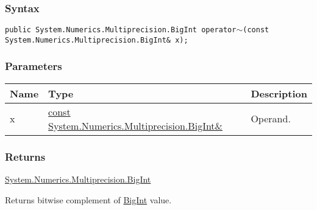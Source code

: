 \documentclass[a4paper,oneside,11.000000pt]{book}
\begin{document}
\subsubsection*{Syntax}
\texttt{public System.Numerics.Multiprecision.BigInt operator$\sim$(const System.Numerics.Multiprecision.BigInt\& x);}
\subsubsection*{Parameters}
\begin{flushleft}
\begin{supertabular}[l]{!{\raggedright}p{1.30721cm}!{\raggedright}p{8.55945cm}!{\raggedright}p{2.65538cm}}
\textbf{Name}
& \textbf{Type}
& \textbf{Description}
\\
\hline
x
& \hyperlink{System.Numerics.Multiprecision.BigInt}{const System.\-Numerics.\-Multiprecision.\-BigInt\&\-}
& Operand.

\\
\end{supertabular}

\end{flushleft}
\subsubsection*{Returns}
\hyperlink{System.Numerics.Multiprecision.BigInt}{System.\-Numerics.\-Multiprecision.\-BigInt}
\begin{flushleft}
Returns bitwise complement of \hyperlink{System.Numerics.Multiprecision.BigInt}{BigInt} value.

\end{flushleft}
\clearpage
\end{document}
